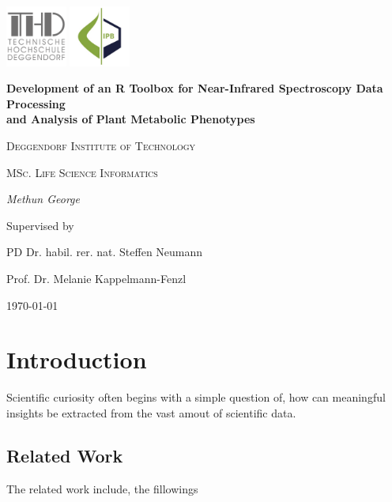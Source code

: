 \documentclass[12pt,a4paper]{report}
\begin{document}
\begin{titlepage}
    \centering
    \begin{flushright}
        \centering
        \includegraphics[width=2cm]{images/thd.png} %
        \hspace{0cm} %
        \includegraphics[width=2cm]{images/ipb.jpg} %
    \end{flushright}
    {\huge\bfseries Development of an R Toolbox for Near-Infrared Spectroscopy Data Processing \\
    and Analysis of Plant Metabolic Phenotypes\par}
    \vspace{2cm}
    {\LARGE \textsc{Deggendorf Institute of Technology}\par}
    \vspace{1cm}
    {\Large \textsc{MSc. Life Science Informatics}\par}
    \vspace{1.5cm}
    {\Large\itshape Methun George\par}
    \vfill
    Supervised by\par
    PD Dr. habil. rer. nat. Steffen Neumann\par
    Prof. Dr. Melanie Kappelmann-Fenzl
    \vfill
    {\large \today\par}
\end{titlepage}

\newpage
\tableofcontents
\newpage


\chapter{Introduction}
Scientific curiosity often begins with a simple question of, how can meaningful insights be extracted from the vast amout of scientific data.   
\section{Related Work}
The related work include, the fillowings
\end{document}
